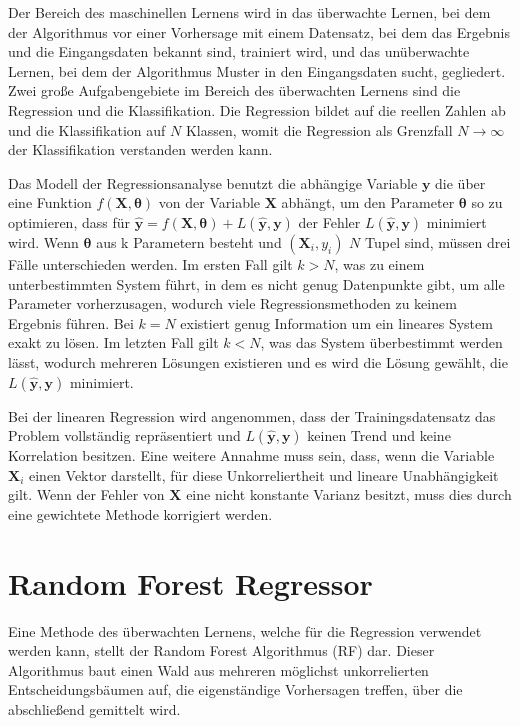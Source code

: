 Der Bereich des maschinellen Lernens wird in das überwachte Lernen, bei dem der Algorithmus vor einer Vorhersage mit einem Datensatz, bei dem das Ergebnis und die Eingangsdaten bekannt
sind, trainiert wird, und das unüberwachte Lernen, bei dem der Algorithmus Muster in den Eingangsdaten sucht, gegliedert.
Zwei große Aufgabengebiete im Bereich des überwachten Lernens sind die Regression und die Klassifikation. Die Regression bildet
auf die reellen Zahlen ab und die Klassifikation auf $N$ Klassen, womit die Regression als Grenzfall $N \to \infty$ der Klassifikation
verstanden werden kann.

Das Modell der Regressionsanalyse benutzt die abhängige Variable $\symbf{y}$ die über eine Funktion $f(\symbf{X},\symbf{\theta})$ von der Variable $\symbf{X}$ abhängt, um
den Parameter $\symbf{\theta}$ so zu optimieren, dass für $\symbf{\hat{y}} = f(\symbf{X},\symbf{\theta}) + L(\symbf{\hat{y}},\symbf{y})$ der Fehler
$L(\symbf{\hat{y}},\symbf{y})$ minimiert wird.
Wenn $\symbf{\theta}$ aus k Parametern besteht und $(\symbf{X}_i,y_i)$ $N$ Tupel sind, müssen drei Fälle unterschieden werden.
Im ersten Fall gilt $k>N$, was zu einem unterbestimmten System führt, in dem es nicht genug Datenpunkte gibt, um alle Parameter
vorherzusagen, wodurch viele Regressionsmethoden zu keinem Ergebnis führen.
Bei $k = N$ existiert genug Information um ein lineares System exakt zu lösen.
Im letzten Fall gilt $k<N$, was das System überbestimmt werden lässt, wodurch mehreren Lösungen existieren und
es wird die Lösung gewählt, die $L(\symbf{\hat{y}},\symbf{y})$ minimiert.

Bei der linearen Regression wird angenommen, dass der Trainingsdatensatz das Problem vollständig repräsentiert und $L(\symbf{\hat{y}},\symbf{y})$ keinen Trend
und keine Korrelation besitzen.
Eine weitere Annahme muss sein, dass, wenn die Variable $\symbf{X}_i$ einen Vektor darstellt, für diese Unkorreliertheit und lineare Unabhängigkeit gilt.
Wenn der Fehler von $\symbf{X}$ eine nicht konstante Varianz besitzt, muss dies durch eine gewichtete Methode korrigiert werden.

\section{Random Forest Regressor}
\label{sec:RF}

Eine Methode des überwachten Lernens, welche für die Regression verwendet werden kann, stellt der Random Forest Algorithmus (RF) dar. Dieser Algorithmus baut
einen Wald aus mehreren möglichst unkorrelierten Entscheidungsbäumen auf, die eigenständige Vorhersagen treffen, über die abschließend gemittelt wird.

